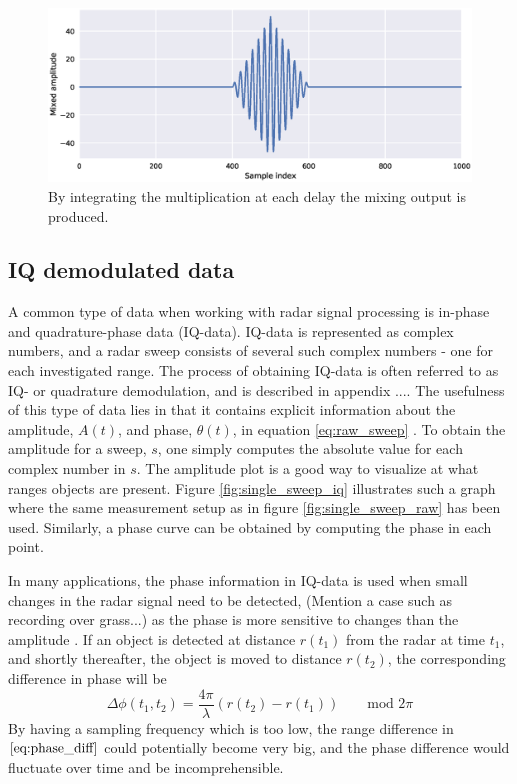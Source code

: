 \begin{figure}[h]
	\centering
	\includegraphics[scale=0.5]{figs_temp/mixing2}
	\caption{By integrating the multiplication at each delay the mixing output is produced.}
	\label{fig:mix2}
\end{figure}



\subsection{IQ demodulated data}
\label{IQ}
A common type of data when working with radar signal processing is in-phase and quadrature-phase data (IQ-data). IQ-data is represented as complex numbers, and a radar sweep consists of several such complex numbers - one for each investigated range. The process of obtaining IQ-data is often referred to as IQ- or quadrature demodulation, and is described in appendix .... The usefulness of this type of data lies in that it contains explicit information about the amplitude, $A(t)$, and phase, $\theta(t)$, in equation \eqref{eq:raw_sweep} \citep{richards_2014}. To obtain the amplitude for a sweep, $s$, one simply computes the absolute value for each complex number in $s$. The amplitude plot is a good way to visualize at what ranges objects are present. Figure \ref{fig:single_sweep_iq} illustrates such a graph where the same measurement setup as in figure \ref{fig:single_sweep_raw} has been used. Similarly, a phase curve can be obtained by computing the phase in each point.

In many applications, the phase information in IQ-data is used when small changes in the radar signal need to be detected, (Mention a case such as recording over grass...) as the phase is more sensitive to changes than the amplitude \citep{lien_gillian_karagozler_amihood_schwesig_olson_raja_poupyrev_2016}. If an object is detected at distance $r(t_1)$ from the radar at time $t_1$, and shortly thereafter, the object is moved to distance $r(t_2)$, the corresponding difference in phase will be
\begin{equation}
	\label{eq:phase_diff}
	\Delta\phi(t_1, t_2)=\frac{4\pi}{\lambda}(r(t_2)-r(t_1)) \quad\quad \textrm{mod 2$\pi$}
\end{equation}
By having a sampling frequency which is too low, the range difference in $\eqref{eq:phase_diff}$ could potentially become very big, and the phase difference would fluctuate over time and be incomprehensible.

